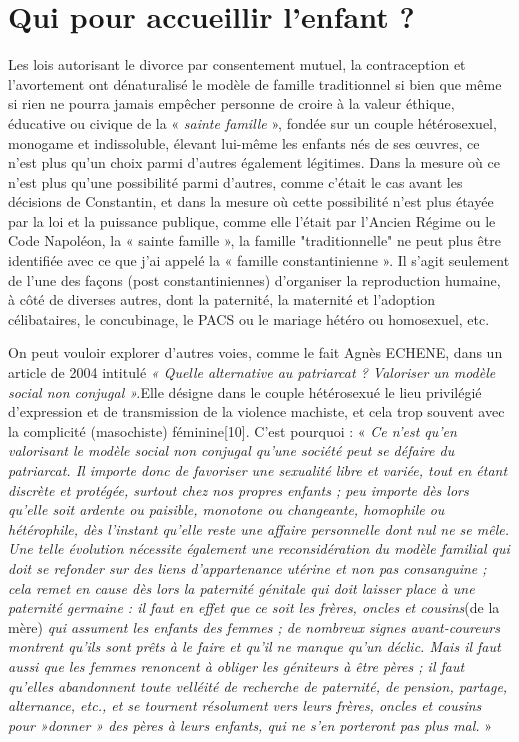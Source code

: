 
\chapter{Qui pour accueillir l'enfant ?}


Les lois autorisant le divorce par consentement mutuel, la contraception et l'avortement ont dénaturalisé le modèle de famille traditionnel si bien que même si rien ne pourra jamais empêcher personne de croire à la valeur éthique, éducative ou civique de la « \emph{sainte famille} », fondée sur un couple hétérosexuel, monogame et indissoluble, élevant lui-même les enfants nés de ses œuvres, ce n'est plus qu'un choix parmi d'autres également légitimes. Dans la mesure où ce n'est plus qu'une possibilité parmi d'autres, comme c'était le cas avant les décisions de Constantin, et dans la mesure où cette possibilité n'est plus étayée par la loi et la puissance publique, comme elle l'était par l'Ancien Régime ou le Code Napoléon, la « sainte famille », la famille "traditionnelle" ne peut plus être identifiée avec ce que j'ai appelé la « famille constantinienne ». Il s'agit seulement de l'une des façons (post constantiniennes) d'organiser la reproduction humaine, à côté de diverses autres, dont la paternité, la maternité et l'adoption célibataires, le concubinage, le PACS ou le mariage hétéro ou homosexuel, etc.
 
 On peut vouloir explorer d'autres voies, comme le fait Agnès ECHENE, dans un article de 2004 intitulé \emph{« Quelle alternative au patriarcat ? Valoriser un modèle social non conjugal ».}Elle désigne dans le couple hétérosexué le lieu privilégié d'expression et de transmission de la violence machiste, et cela trop souvent avec la complicité (masochiste) féminine[10]. C'est pourquoi : « \emph{Ce n'est qu'en valorisant le modèle social non conjugal qu'une société peut se défaire du patriarcat. Il importe donc de favoriser une sexualité libre et variée, tout en étant discrète et protégée, surtout chez nos propres enfants ; peu importe dès lors qu'elle soit ardente ou paisible, monotone ou changeante, homophile ou hétérophile, dès l'instant qu'elle reste une affaire personnelle dont nul ne se mêle. Une telle évolution nécessite également une reconsidération du modèle familial qui doit se refonder sur des liens d'appartenance utérine et non pas consanguine ; cela remet en cause dès lors la paternité génitale qui doit laisser place à une paternité germaine : il faut en effet que ce soit les frères, oncles et cousins}(de la mère)\emph{ qui assument les enfants des femmes ; de nombreux signes avant-coureurs montrent qu'ils sont prêts à le faire et qu'il ne manque qu'un déclic. Mais il faut aussi que les femmes renoncent à obliger les géniteurs à être pères ; il faut qu'elles abandonnent toute velléité de recherche de paternité, de pension, partage, alternance, etc., et se tournent résolument vers leurs frères, oncles et cousins pour »donner » des pères à leurs enfants, qui ne s'en porteront pas plus mal.} » 
 

